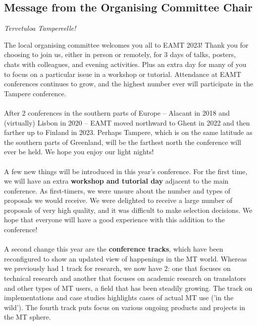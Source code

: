 \documentclass[a4paper,11pt,twoside]{book}
\begin{document}
\begin{onehalfspacing}
\chapter*{Message from the Organising Committee Chair}

\emph{Tervetuloa Tampereelle!}

\noindent 
The local organising committee welcomes you all to EAMT 2023! Thank you for choosing to join us, either in person or remotely, for 3 days of talks, posters, chats with colleagues, and evening activities. Plus an extra day for many of you to focus on a particular issue in a workshop or tutorial. Attendance at EAMT conferences continues to grow, and the highest number ever will participate in the Tampere conference.\\
\\
\noindent
After 2 conferences in the southern parts of Europe – Alacant in 2018 and (virtually) Lisbon in 2020 – EAMT moved northward to Ghent in 2022 and then farther up to Finland in 2023. Perhaps Tampere, which is on the same latitude as the southern parts of Greenland, will be the farthest north the conference will ever be held. We hope you enjoy our light nights!\\
\\
\noindent
A few new things will be introduced in this year’s conference. For the first time, we will have an extra \textbf{workshop and tutorial day} adjacent to the main conference. As first-timers, we were unsure about the number and types of proposals we would receive. We were delighted to receive a large number of proposals of very high quality, and it was difficult to make selection decisions. We hope that everyone will have a good experience with this addition to the conference!\\
\\
\noindent
A second change this year are the \textbf{conference tracks}, which have been reconfigured to show an updated view of happenings in the MT world. Whereas we previously had 1 track for research, we now have 2: one that focuses on technical research and another that focuses on academic research on translators and other types of MT users, a field that has been steadily growing. The track on implementations and case studies highlights cases of actual MT use (’in the wild’). The fourth track puts focus on various ongoing products and projects in the MT sphere.\\

\end{onehalfspacing}
\end{document}
